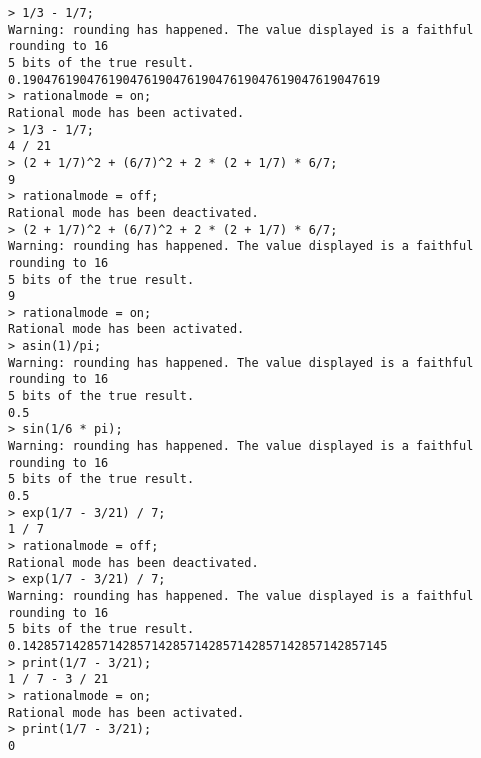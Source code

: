 \begin{center}\begin{minipage}{15cm}\begin{Verbatim}[frame=single]
> 1/3 - 1/7;
Warning: rounding has happened. The value displayed is a faithful rounding to 16
5 bits of the true result.
0.19047619047619047619047619047619047619047619047619
> rationalmode = on;
Rational mode has been activated.
> 1/3 - 1/7;
4 / 21
> (2 + 1/7)^2 + (6/7)^2 + 2 * (2 + 1/7) * 6/7;
9
> rationalmode = off;
Rational mode has been deactivated.
> (2 + 1/7)^2 + (6/7)^2 + 2 * (2 + 1/7) * 6/7;
Warning: rounding has happened. The value displayed is a faithful rounding to 16
5 bits of the true result.
9
> rationalmode = on;
Rational mode has been activated.
> asin(1)/pi;
Warning: rounding has happened. The value displayed is a faithful rounding to 16
5 bits of the true result.
0.5
> sin(1/6 * pi);
Warning: rounding has happened. The value displayed is a faithful rounding to 16
5 bits of the true result.
0.5
> exp(1/7 - 3/21) / 7;
1 / 7
> rationalmode = off;
Rational mode has been deactivated.
> exp(1/7 - 3/21) / 7;
Warning: rounding has happened. The value displayed is a faithful rounding to 16
5 bits of the true result.
0.142857142857142857142857142857142857142857142857145
> print(1/7 - 3/21);
1 / 7 - 3 / 21
> rationalmode = on;
Rational mode has been activated.
> print(1/7 - 3/21);
0
\end{Verbatim}
\end{minipage}\end{center}
